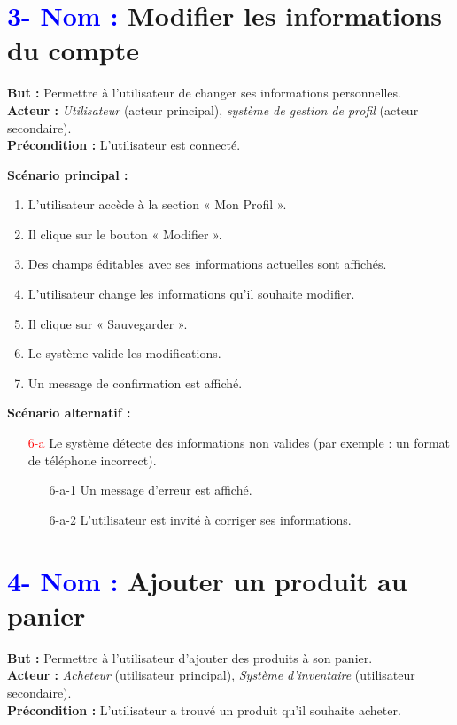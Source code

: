 \documentclass[16pt]{report}
\begin{document}
\section*{\textbf{\textcolor{blue}{3- Nom :}} Modifier les informations du compte}

\textbf{But :} Permettre à l'utilisateur de changer ses informations personnelles. \\
\textbf{Acteur :} \textit{Utilisateur} (acteur principal), \textit{système de gestion de profil} (acteur secondaire). \\
\textbf{Précondition :} L'utilisateur est connecté.

\textbf{Scénario principal :}
\begin{enumerate}[leftmargin=4em]
    \item L'utilisateur accède à la section « Mon Profil ».
    \item Il clique sur le bouton « Modifier ».
    \item Des champs éditables avec ses informations actuelles sont affichés.
    \item L'utilisateur change les informations qu'il souhaite modifier.
    \item Il clique sur « Sauvegarder ».
    \item Le système valide les modifications.
    \item Un message de confirmation est affiché.
\end{enumerate}

\textbf{Scénario alternatif :}
\begin{enumerate}[leftmargin=4em]
    \item[\textcolor{red}{6-a}] Le système détecte des informations non valides (par exemple : un format de téléphone incorrect).
    \begin{enumerate}[leftmargin=4em]
        \item[6-a-1] Un message d'erreur est affiché.
        \item[6-a-2] L'utilisateur est invité à corriger ses informations.
    \end{enumerate}
\end{enumerate}

\section*{\textbf{\textcolor{blue}{4- Nom :}} Ajouter un produit au panier}

\textbf{But :} Permettre à l'utilisateur d'ajouter des produits à son panier. \\
\textbf{Acteur :} \textit{Acheteur} (utilisateur principal), \textit{Système d'inventaire} (utilisateur secondaire). \\
\textbf{Précondition :} L'utilisateur a trouvé un produit qu'il souhaite acheter.
\end{document}
